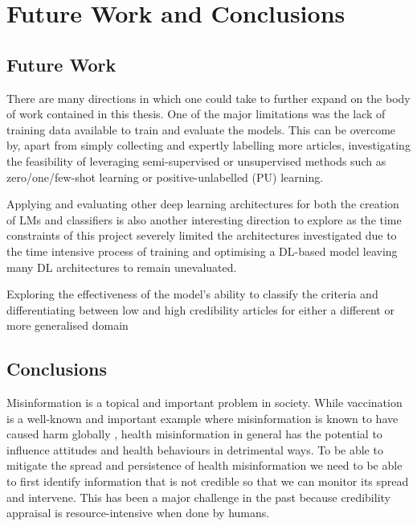 \documentclass[a4paper,twoside,phd]{BYUPhys}
\begin{document}
\chapter{Future Work and Conclusions}
\label{chap:Conclusions}


\section{Future Work}
\label{FutureWork}

There are many directions in which one could take to further expand on the body of work contained in this thesis. One of the major limitations was the lack of training data available to train and evaluate the models. This can be overcome by, apart from simply collecting and expertly labelling more articles, investigating the feasibility of leveraging semi-supervised or unsupervised methods such as zero/one/few-shot learning or positive-unlabelled (PU) learning. \newline

Applying and evaluating other deep learning architectures for both the creation of LMs and classifiers is also another interesting direction to explore as the time constraints of this project severely limited the architectures investigated due to the time intensive process of training and optimising a DL-based model leaving many DL architectures to remain unevaluated.   \newline

Exploring the effectiveness of the model's ability to classify the criteria and differentiating between low and high credibility articles for either a different or more generalised domain 

\section{Conclusions}
\label{sec:ConclusionsConclusions}

Misinformation is a topical and important problem in society. While vaccination is a well-known and important example where misinformation is known to have caused harm globally \cite{larson2018biggest}, health misinformation in general has the potential to influence attitudes and health behaviours in detrimental ways. To be able to mitigate the spread and persistence of health misinformation we need to be able to first identify information that is not credible so that we can monitor its spread and intervene. This has been a major challenge in the past because credibility appraisal is resource-intensive when done by humans. \newline
\end{document}
